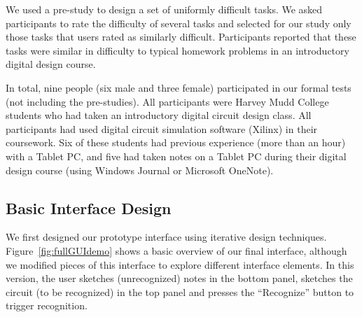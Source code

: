 \documentclass{elsart}
\begin{document}


We used a pre-study to design a set of uniformly difficult tasks.  We
asked participants to rate the difficulty of several tasks and
selected for our study only those tasks that users rated as similarly
difficult.  Participants reported that these tasks were similar in
difficulty to typical homework problems in an introductory digital
design course.


In total, nine people (six male and three female) participated in our
formal tests (not including the pre-studies). All participants were
Harvey Mudd College students who had taken an introductory digital
circuit design class.  All participants had used digital circuit
simulation software (Xilinx) in their coursework.  Six of these
students had previous experience (more than an hour) with a Tablet PC,
and five had taken notes on a Tablet PC during their digital design
course (using Windows Journal or Microsoft OneNote).

\subsection{Basic Interface Design}
We first designed our prototype interface using iterative design
techniques.  Figure~\ref{fig:fullGUIdemo} shows a basic overview of
our final interface, although we modified pieces of this interface to
explore different interface elements.  In this version, the user
sketches (unrecognized) notes in the bottom panel, sketches the
circuit (to be recognized) in the top panel and presses the ``Recognize''
button to trigger recognition.
\end{document}
